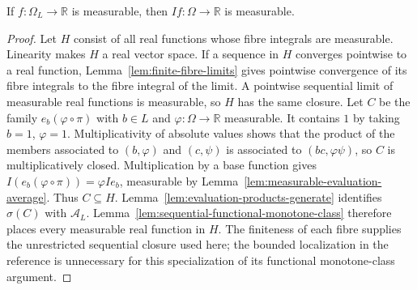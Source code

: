 \begin{theorem}\label{thm:measurable-fibre-integral}
\leanok
{}
If $f:\Omega_L\to\mathbb R$ is measurable, then $If:\Omega\to\mathbb R$
is measurable.
\end{theorem}
\begin{proof}
Let $H$ consist of all real functions whose fibre integrals are measurable.
Linearity makes $H$ a real vector space. If a sequence in $H$ converges
pointwise to a real function, Lemma~\ref{lem:finite-fibre-limits} gives
pointwise convergence of its fibre integrals to the fibre integral of
the limit. A pointwise sequential limit of measurable real functions
is measurable, so $H$ has the same closure.
Let $C$ be the family $e_b(\varphi\circ\pi)$ with $b\in L$ and
$\varphi:\Omega\to\mathbb R$ measurable. It contains $1$ by taking
$b=1$, $\varphi=1$. Multiplicativity of absolute values shows that
the product of the members associated to $(b,\varphi)$ and
$(c,\psi)$ is associated to $(bc,\varphi\psi)$, so $C$ is
multiplicatively closed. Multiplication by a base function gives
$I(e_b(\varphi\circ\pi))=\varphi Ie_b$, measurable by
Lemma~\ref{lem:measurable-evaluation-average}. Thus $C\subseteq H$.
Lemma~\ref{lem:evaluation-products-generate} identifies $\sigma(C)$
with $\mathcal A_L$. Lemma~\ref{lem:sequential-functional-monotone-class}
therefore places every measurable real function in $H$. The finiteness
of each fibre supplies the unrestricted sequential closure used here;
the bounded localization in the reference is unnecessary for this
specialization of its functional monotone-class argument.
\end{proof}

